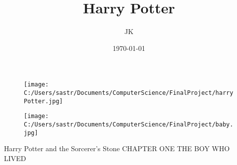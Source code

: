 \documentclass{article}%
\title{Harry Potter}%
\author{JK }%
\date{\today}%
\begin{document}
%
\normalsize%


\begin{figure}[h!]%
\centering%
\texttt{[image: C:/Users/sastr/Documents/ComputerScience/FinalProject/harryPotter.jpg]}%
\end{figure}

%
\maketitle%


\begin{figure}[h!]%
\centering%
\texttt{[image: C:/Users/sastr/Documents/ComputerScience/FinalProject/baby.jpg]}%
\end{figure}

%

\newline%
Harry Potter and the Sorcerer's Stone
\newline%
CHAPTER ONE
\newline%
THE BOY WHO LIVED
\newline%
\end{document}
